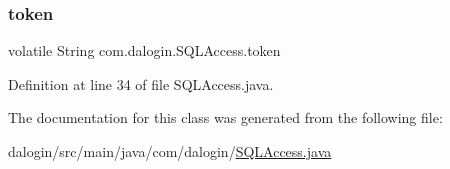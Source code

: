 \subsubsection{\texorpdfstring{token}{token}}
{\footnotesize\ttfamily volatile String com.\+dalogin.\+S\+Q\+L\+Access.\+token\hspace{0.3cm}{\ttfamily [static]}}



Definition at line 34 of file S\+Q\+L\+Access.\+java.



The documentation for this class was generated from the following file\+:\begin{DoxyCompactItemize}
\item 
dalogin/src/main/java/com/dalogin/\hyperlink{_s_q_l_access_8java}{S\+Q\+L\+Access.\+java}\end{DoxyCompactItemize}
